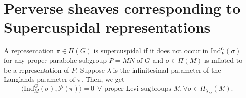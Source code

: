 \documentclass[11pt,letterpaper]{amsart}
\newcommand{\ol}{\overline}
\newcommand{\irrepdual}[1]{\widehat{#1}}
\newcommand{\pure}{\mathrm{pure}}
\newcommand{\Ind}{\mathrm{Ind}}
\newcommand{\LLC}{\mathrm{LLC}}
\newcommand{\locsys}[2]{\underline{#1}_{#2}}
\newcommand{\stsh}[2]{{#1}_{#2}}
\renewcommand{\1}{\mathbbm{1}}
\numberwithin{equation}{section}
\begin{document}
{\section{Perverse sheaves corresponding to Supercuspidal representations}
A representation $\pi\in \Pi(G)$ is supercuspidal if it does not occur in $\Ind_P^G(\sigma)$ for any proper parabolic subgroup $P=MN$ of $G$ and $\sigma \in \Pi(M)$ is inflated to be a representation of $P$. Suppose $\lambda$ is the infinitesimal parameter of the Langlands parameter of $\pi$. Then, we get
\[\langle \Ind_M^G(\sigma), \mathcal{P}(\pi)\rangle = 0 ~~ \forall \text{ proper Levi sugbroups }M, \forall \sigma \in \Pi_{\lambda_M}(M).\] \fi

}
\end{document}
